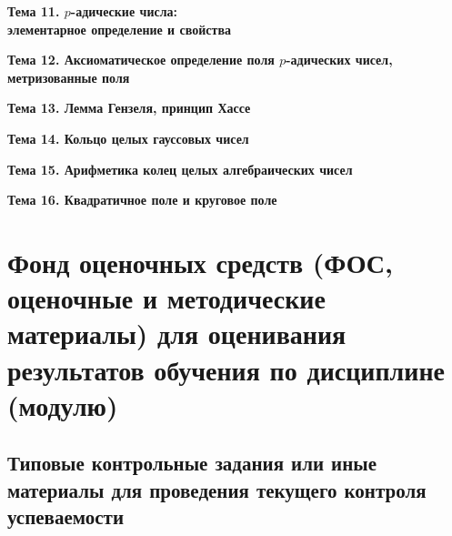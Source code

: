 \documentclass[a4paper, 12pt]{article}
\begin{document}
\begin{center} {\bf Тема 11. $p$-адические числа:\\ элементарное определение и свойства} \end{center}



\begin{center} {\bf Тема 12. Аксиоматическое определение поля $p$-адических чисел,\\ метризованные поля} \end{center}



\begin{center} {\bf Тема 13. Лемма Гензеля, принцип Хассе} \end{center}



\begin{center} {\bf Тема 14. Кольцо целых гауссовых чисел} \end{center}



\begin{center} {\bf Тема 15. Арифметика колец целых алгебраических чисел} \end{center}



\begin{center} {\bf Тема 16. Квадратичное поле и круговое поле} \end{center}




\section{Фонд оценочных средств (ФОС, оценочные и методические материалы) для оценивания результатов обучения по дисциплине (модулю)}

\subsection{Типовые контрольные задания или иные материалы для проведения текущего контроля успеваемости}
\end{document}
